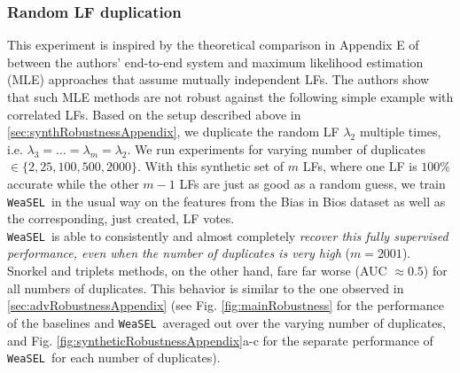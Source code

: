 \documentclass{article}
\newcommand{\weasel}{\texttt{WeaSEL}}\newcommand{\brackets}[1]{\left( #1 \right)}
\begin{document}
\subsubsection{Random LF duplication}
\label{sec:synthRobustnessDuplicatesAppendix}
This experiment is inspired by the theoretical comparison in Appendix E of \cite{MaxMIG} between the authors' end-to-end system and maximum likelihood estimation (MLE) approaches that assume mutually independent LFs. 
The authors show that such MLE methods are not robust against the following simple example with correlated LFs.
Based on the setup described above in \ref{sec:synthRobustnessAppendix}, we duplicate the random LF $\lambda_2$ multiple times, i.e. $\lambda_3 = \dots = \lambda_m=\lambda_2$. 
We run experiments for varying number of duplicates $\in \{2, 25, 100, 500, 2000\}$.
With this synthetic set of $m$ LFs, where one LF is $100\%$ accurate while the other $m-1$ LFs are just as good as a random guess, we train \weasel\ in the usual way on the features from the Bias in Bios dataset as well as the corresponding, just created, LF votes.
\\
\weasel\ is able to consistently and almost completely \emph{recover this fully supervised performance, even when the number of duplicates is very high} ($m=2001$). 
Snorkel and triplets methods, on the other hand, fare far worse (AUC $\approx 0.5$) for all numbers of duplicates. This behavior is similar to the one observed in \ref{sec:advRobustnessAppendix} (see Fig. \ref{fig:mainRobustness} for the performance of the baselines and \weasel\ averaged out over the varying number of duplicates, and Fig. \ref{fig:syntheticRobustnessAppendix}a-c for the separate performance of \weasel\ for each number of duplicates).
\end{document}
